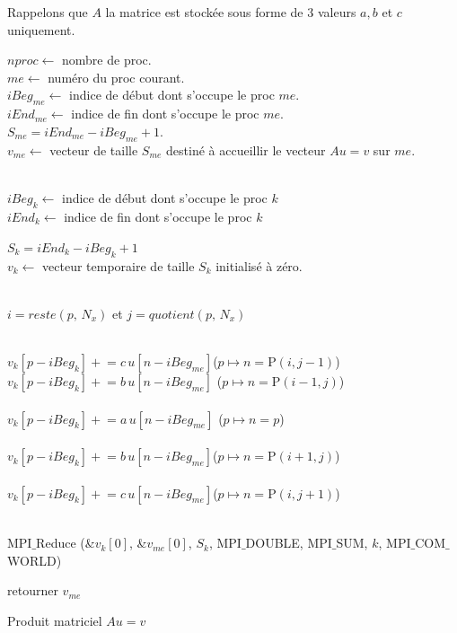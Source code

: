 \documentclass[11pt,a4paper]{article}
\newcommand{\pluseq}{\mathrel{+}=}
\begin{document}
Rappelons que $A$ la matrice est stockée sous forme de $3$ valeurs $a, b$ et $c$ uniquement.\\
\begin{algorithm}[H]
\SetAlgoLined
$nproc\gets$ nombre de proc.\\
$me\gets$ numéro du proc courant.\\
$iBeg_{me}\gets$ indice de début dont s'occupe le proc $me$.\\
$iEnd_{me}\gets$ indice de fin dont s'occupe le proc $me$.\\
$S_{me} = iEnd_{me}-iBeg_{me} + 1$.\\
$v_{me} \gets$ vecteur de taille $S_{me}$ destiné à accueillir le vecteur $Au=v$ sur $me$.\\ 
~\\
{
	$iBeg_k\gets$ indice de début dont s'occupe le proc $k$\\
	$iEnd_k\gets$ indice de fin dont s'occupe le proc $k$\\
	~\\
	$S_{k} = iEnd_{k}-iBeg_{k} + 1$\\
	$v_{k} \gets$ vecteur temporaire de taille $S_{k}$ initialisé à zéro.\\
	~\\ 
	{ 
		$i = reste(p,\,N_x)$ et $j = quotient(p,\, N_x)$\\
		~\\
		{
			{
				{
					$v_k [p-iBeg_{k}] \pluseq c\, u [n - iBeg_{me}]$\hfill($p\mapsto n=$P$(i, j-1)$)\\
				}
			}
			{
				{
					$v_k [p-iBeg_{k}] \pluseq b\, u [n - iBeg_{me}]$ \hfill($p\mapsto n=$P$(i-1, j)$)\\
				}
			}
			~\\
			{
				$v_k [p-iBeg_{k}] \pluseq a\, u [n - iBeg_{me}]$ \hfill($p\mapsto n=p$)\\
			}			
			~\\
			{
				{
					$v_k [p-iBeg_{k}] \pluseq b\, u [n - iBeg_{me}]$\hfill($p\mapsto n=$P$(i+1, j)$)\\
				}
			}
			~\\
			{
				{
					$v_k [p-iBeg_{k}] \pluseq c\, u [n - iBeg_{me}]$\hfill($p\mapsto n=$P$(i, j+1)$)\\
				}
			}
			
		}
		
		~\\
		MPI$\_$Reduce (\&$v_{k}[0]$, \&$v_{me}[0]$, $S_k$, MPI$\_$DOUBLE, MPI$\_$SUM, $k$, MPI$\_$COM$\_$WORLD)\\
	}
	
	retourner $v_{me}$\\
}
 \caption{Produit matriciel $Au = v$}
\end{algorithm}
\end{document}
